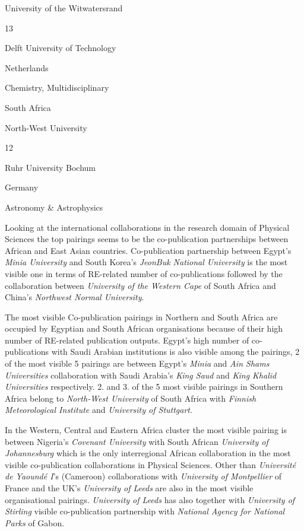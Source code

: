 \documentclass[
]{book}
\begin{document}
{University of the Witwatersrand }

{13}

{Delft University of Technology }

{Netherlands }

{Chemistry, Multidisciplinary }

{South Africa}

{North-West University }

{12}

{Ruhr University Bochum }

{Germany }

{Astronomy \& Astrophysics }

Looking at the international collaborations in the research domain of Physical Sciences the top pairings seems to be the co-publication partnerships between African and East Asian countries. Co-publication partnership between Egypt's \emph{Minia University} and South Korea's \emph{JeonBuk National University} is the most visible one in terms of RE-related number of co-publications followed by the collaboration between \emph{University of the Western Cape} of South Africa and China's \emph{Northwest Normal University}.

The most visible Co-publication pairings in Northern and South Africa are occupied by Egyptian and South African organisations because of their high number of RE-related publication outputs. Egypt's high number of co-publications with Saudi Arabian institutions is also visible among the pairings, 2 of the most visible 5 pairings are between Egypt's \emph{Minia} and \emph{Ain Shams Universities} collaboration with Saudi Arabia's \emph{King Saud} and \emph{King Khalid Universities} respectively. 2. and 3. of the 5 most visible pairings in Southern Africa belong to \emph{North-West University} of South Africa with \emph{Finnish Meteorological Institute} and \emph{University of Stuttgart}.

In the Western, Central and Eastern Africa cluster the most visible pairing is between Nigeria's \emph{Covenant University} with South African \emph{University of Johannesburg} which is the only interregional African collaboration in the most visible co-publication collaborations in Physical Sciences. Other than \emph{Université de Yaoundé I}'s (Cameroon) collaborations with \emph{University of Montpellier} of France and the UK's \emph{University of Leeds} are also in the most visible organisational pairings. \emph{University of Leeds} has also together with \emph{University of Stirling} visible co-publication partnership with \emph{National Agency for National Parks} of Gabon.
\end{document}
